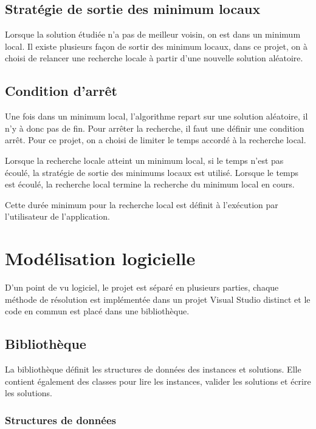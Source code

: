 \subsection{Stratégie de sortie des minimum locaux}
Lorsque la solution étudiée n'a pas de meilleur voisin, on est dans un minimum local.
Il existe plusieurs façon de sortir des minimum locaux, dans ce projet, on à choisi de relancer une recherche locale à partir d'une nouvelle solution aléatoire.


\subsection{Condition d'arrêt}
Une fois dans un minimum local, l'algorithme repart sur une solution aléatoire, il n'y à donc pas de fin.
Pour arrêter la recherche, il faut une définir une condition arrêt.
Pour ce projet, on a choisi de limiter le temps accordé à la recherche local.

Lorsque la recherche locale atteint un minimum local, si le temps n'est pas écoulé, la stratégie de sortie des minimums locaux est utilisé.
Lorsque le temps est écoulé, la recherche local termine la recherche du minimum local en cours.

Cette durée minimum pour la recherche local est définit à l'exécution par l'utilisateur de l'application.

\section{Modélisation logicielle}

D'un point de vu logiciel, le projet est séparé en plusieurs parties, 
chaque méthode de résolution est implémentée dans un projet Visual Studio distinct et
le code en commun est placé dans une bibliothèque.

\subsection{Bibliothèque}

La bibliothèque définit les structures de données des instances et solutions.
Elle contient également des classes pour lire les instances, valider les solutions et écrire les solutions.

\subsubsection{Structures de données}


